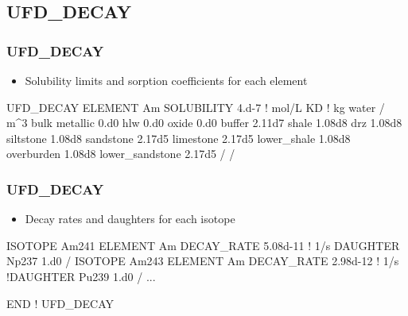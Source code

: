 \documentclass{beamer}
\newcommand\bluecomment[1]{{{\color{blue} #1}}}
\begin{document}
\subsection{UFD\_DECAY}
\begin{frame}[fragile]\frametitle{UFD\_DECAY}

\begin{itemize}
  \item Solubility limits and sorption coefficients for each element
\end{itemize}

\begin{semiverbatim}\small
UFD_DECAY
  ELEMENT Am
    SOLUBILITY 4.d-7 \bluecomment{! mol/L}
    KD \bluecomment{! kg water / m^3 bulk}
      metallic 0.d0
      hlw 0.d0
      oxide 0.d0
      buffer 2.11d7
      shale 1.08d8
      drz 1.08d8
      siltstone 1.08d8
      sandstone 2.17d5
      limestone 2.17d5
      lower_shale 1.08d8
      overburden 1.08d8
      lower_sandstone 2.17d5
    /
  /
\end{semiverbatim}
\end{frame}

\begin{frame}[fragile]\frametitle{UFD\_DECAY}

\begin{itemize}
  \item Decay rates and daughters for each isotope
\end{itemize}

\begin{semiverbatim}\small
  ISOTOPE Am241
    ELEMENT Am
    DECAY_RATE 5.08d-11 \bluecomment{! 1/s}
    DAUGHTER Np237 1.d0
  /
  ISOTOPE Am243
    ELEMENT Am
    DECAY_RATE 2.98d-12 \bluecomment{! 1/s}
    \bluecomment{!DAUGHTER Pu239 1.d0}
  /
\bluecomment{...}

END \bluecomment{! UFD_DECAY}
\end{semiverbatim}
\end{frame}

\end{document}
